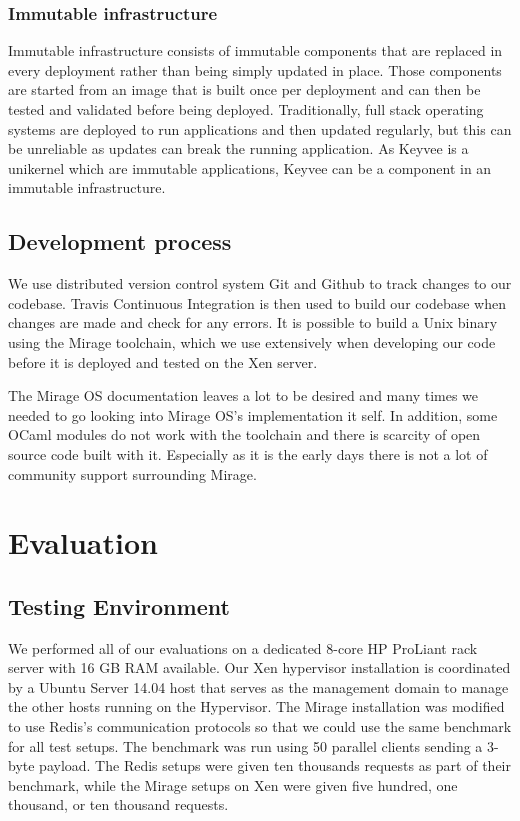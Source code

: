 \documentclass[english,10pt,twocolumn]{article}
\begin{document}
\subsubsection{Immutable infrastructure}

Immutable infrastructure consists of immutable components that are replaced in every deployment rather than being simply updated in place.
Those components are started from an image that is built once per deployment and can then be tested and validated before being deployed.
Traditionally, full stack operating systems are deployed to run applications and then updated regularly, but this can be unreliable as updates can break the running application.
As Keyvee is a unikernel which are immutable applications, Keyvee can be a component in an immutable infrastructure.

\subsection{Development process}

We use distributed version control system Git and Github to track changes to our codebase.
Travis Continuous Integration is then used to build our codebase when changes are made and check for any errors.
It is possible to build a Unix binary using the Mirage toolchain, which we use extensively when developing our code before it is deployed and tested on the Xen server.

The Mirage OS documentation leaves a lot to be desired and many times we needed to go looking into Mirage OS's implementation it self.
In addition, some OCaml modules do not work with the toolchain and there is scarcity of open source code built with it.
Especially as it is the early days there is not a lot of community support surrounding Mirage.


\section{Evaluation}
\subsection{Testing Environment}
We performed all of our evaluations on a dedicated 8-core HP ProLiant rack server with 16 GB RAM available.
Our Xen hypervisor installation is coordinated by a Ubuntu Server 14.04 host that serves as the management domain to manage the other hosts running on the Hypervisor.
The Mirage installation was modified to use Redis's communication protocols so that we could use the same benchmark for all test setups. The benchmark was run using 50 parallel clients sending a 3-byte payload.
The Redis setups were given ten thousands requests as part of their benchmark, while the Mirage setups on Xen were given five hundred, one thousand, or ten thousand requests.
\end{document}
